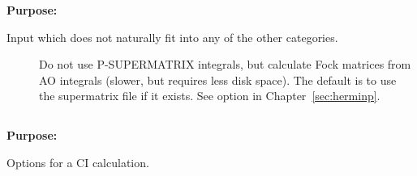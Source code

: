 {\bf Purpose:}

Input which does not naturally fit into any of the other
categories.

\begin{description}
\item[]
  Do not use P-SUPERMATRIX integrals, but calculate Fock matrices
  from AO integrals (slower, but requires less disk space). The
  default is to use the supermatrix file if it exists. See option
   in Chapter~\ref{sec:herminp}.

\end{description}

\pagebreak[3]
\subsection{\label{ref-cicinp}}

{\bf Purpose:}

Options for a CI calculation.


